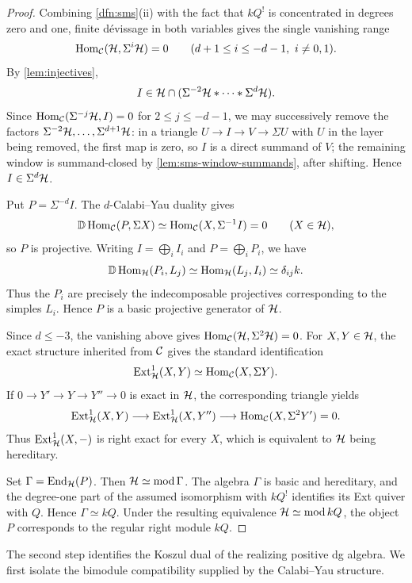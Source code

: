 \documentclass[11pt,a4paper,dvipsnames,x11names]{amsart}
\begin{document}
\begin{proof}
    Combining \cref{dfn:sms}(ii) with the fact that $kQ^!$ is concentrated in degrees zero and one, finite d\'evissage in both variables gives the single vanishing range
    \[
        \operatorname{Hom}_{\mathcal C}(\mathcal H,\Sigma^i\mathcal H)=0
        \qquad
        (d+1\leq i\leq-d-1,\ i\neq0,1).
    \]
    By \cref{lem:injectives},
    \[
        I\in\mathcal H\cap(\Sigma^{-2}\mathcal H*\cdots*\Sigma^d\mathcal H).
    \]
    Since $\operatorname{Hom}_{\mathcal C}(\Sigma^{-j}\mathcal H,I)=0$ for $2\leq j\leq-d-1$, we may successively remove the factors $\Sigma^{-2}\mathcal H,\ldots,\Sigma^{d+1}\mathcal H$: in a triangle $U\to I\to V\to\Sigma U$ with $U$ in the layer being removed, the first map is zero, so $I$ is a direct summand of $V$; the remaining window is summand-closed by \cref{lem:sms-window-summands}, after shifting. Hence $I\in\Sigma^d\mathcal H$.

    Put $P=\Sigma^{-d}I$. The $d$-Calabi--Yau duality gives
    \[
        \mathbb D\operatorname{Hom}_{\mathcal C}(P,\Sigma X)
        \simeq
        \operatorname{Hom}_{\mathcal C}(X,\Sigma^{-1}I)=0
        \qquad
        (X\in\mathcal H),
    \]
    so $P$ is projective. Writing $I=\bigoplus_iI_i$ and $P=\bigoplus_iP_i$, we have
    \[
        \mathbb D\operatorname{Hom}_{\mathcal H}(P_i,L_j)
        \simeq
        \operatorname{Hom}_{\mathcal H}(L_j,I_i)
        \simeq
        \delta_{ij}k.
    \]
    Thus the $P_i$ are precisely the indecomposable projectives corresponding to the simples $L_i$. Hence $P$ is a basic projective generator of $\mathcal H$.

    Since $d\leq-3$, the vanishing above gives $\operatorname{Hom}_{\mathcal C}(\mathcal H,\Sigma^2\mathcal H)=0$. For $X,Y\in\mathcal H$, the exact structure inherited from $\mathcal C$ gives the standard identification
    \[
        \operatorname{Ext}^1_{\mathcal H}(X,Y)\simeq\operatorname{Hom}_{\mathcal C}(X,\Sigma Y).
    \]
    If $0\to Y'\to Y\to Y''\to0$ is exact in $\mathcal H$, the corresponding triangle yields
    \[
        \operatorname{Ext}^1_{\mathcal H}(X,Y)\longrightarrow\operatorname{Ext}^1_{\mathcal H}(X,Y'')\longrightarrow\operatorname{Hom}_{\mathcal C}(X,\Sigma^2Y')=0.
    \]
    Thus $\operatorname{Ext}^1_{\mathcal H}(X,-)$ is right exact for every $X$, which is equivalent to $\mathcal H$ being hereditary.

    Set $\Gamma=\operatorname{End}_{\mathcal H}(P)$. Then $\mathcal H\simeq\operatorname{mod}\Gamma$. The algebra $\Gamma$ is basic and hereditary, and the degree-one part of the assumed isomorphism with $kQ^!$ identifies its Ext quiver with $Q$. Hence $\Gamma\simeq kQ$. Under the resulting equivalence $\mathcal H\simeq\operatorname{mod} kQ$, the object $P$ corresponds to the regular right module $kQ$.
\end{proof}

The second step identifies the Koszul dual of the realizing positive dg algebra. We first isolate the bimodule compatibility supplied by the Calabi--Yau structure.
\end{document}

